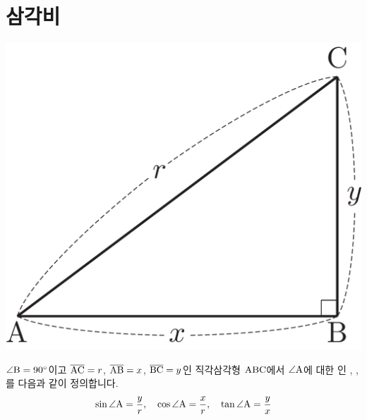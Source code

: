 \section{삼각비}
\begin{center}
\includegraphics[scale=0.125]{pic0/pic154.pdf}
\end{center}$\angle \mathrm{B} = 90^\circ$이고 $\overline{\mathrm{AC}}=r$, $\overline{\mathrm{AB}}=x$, $\overline{\mathrm{BC}}=y$인 직각삼각형 $\mathrm{ABC}$에서 $\angle \mathrm{A}$에 대한 인 , , 를 다음과 같이 정의합니다.
\begin{align*} 
\sin \angle \mathrm{A} = \dfrac{y}{r},\quad
\cos \angle \mathrm{A} = \dfrac{x}{r},\quad
\tan \angle \mathrm{A} = \dfrac{y}{x} 
\end{align*}

